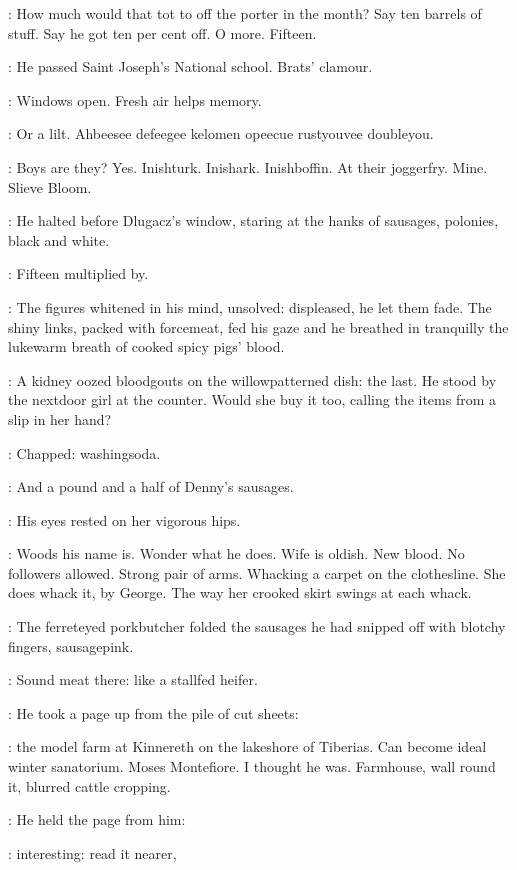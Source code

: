 \BloomInt:
How much would that tot to off the porter in the month?
Say ten barrels of stuff.
Say he got ten per cent off.
O more.
Fifteen.

:
He passed Saint Joseph's National school.
Brats' clamour.

\BloomInt:
Windows open.
Fresh air helps memory.

:
Or a lilt.
Ahbeesee defeegee kelomen opeecue rustyouvee doubleyou.

\BloomInt:
Boys are they?
Yes.
Inishturk.
Inishark.
Inishboffin.
At their joggerfry.
Mine.
Slieve Bloom.

:
He halted before Dlugacz's window,
staring at the hanks of sausages,
polonies, black and white.

\BloomInt:
Fifteen multiplied by.

:
The figures whitened in his mind, unsolved:
displeased, he let them fade.
The shiny links,
packed with forcemeat,
fed his gaze
and he breathed in tranquilly
the lukewarm breath of cooked spicy pigs' blood.

:
A kidney oozed bloodgouts on the willowpatterned dish:
the last.
He stood by the nextdoor girl at the counter.
Would she buy it too,
calling the items from a slip in her hand?

\BloomInt:
Chapped: washingsoda.

\NextDoorGirl:
And a pound and a half of Denny's sausages.

:
His eyes rested on her vigorous hips.

\BloomInt:
Woods his name is.
Wonder what he does.
Wife is oldish.
New blood.
No followers allowed.
Strong pair of arms.
Whacking a carpet on the clothesline.
She does whack it, by George.
The way her crooked skirt swings at each whack.

:
The ferreteyed porkbutcher folded the sausages
he had snipped off
with blotchy fingers, sausagepink.

\BloomInt:
Sound meat there:
like a stallfed heifer.

:
He took a page up from the pile of cut sheets:

\BloomInt:
the model farm at Kinnereth on the lakeshore of Tiberias.
Can become ideal winter sanatorium.
Moses Montefiore.
I thought he was.
Farmhouse, wall round it,
blurred cattle cropping.

:
He held the page from him:

\BloomInt:
interesting:
read it
nearer,


